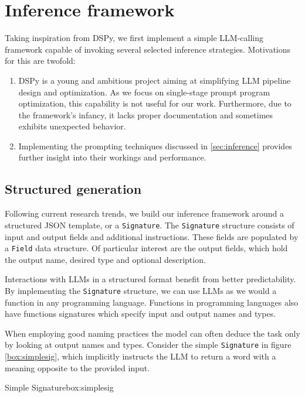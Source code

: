 \section{Inference framework}
Taking inspiration from DSPy\cite{khattab2023dspycompilingdeclarativelanguage}, we first implement a simple LLM-calling framework 
capable of invoking several selected inference strategies. Motivations for this are twofold:
\begin{enumerate}
    \item DSPy is a young and ambitious project aiming at simplifying LLM pipeline design and optimization. 
    As we focus on single-stage prompt program optimization, this capability is not useful for our work. 
    Furthermore, due to the framework's infancy, it lacks proper documentation and sometimes exhibits unexpected behavior.
    \item Implementing the prompting techniques discussed in \ref{sec:inference} provides further insight into their workings and performance.
\end{enumerate}

\subsection{Structured generation}
Following current research trends\cite{zhang2025metapromptingaisystems}, we build our inference framework around a structured JSON template,
or a \texttt{Signature}. The \texttt{Signature} structure consists of input and output fields and additional instructions. 
These fields are populated by a \texttt{Field} data structure.
Of particular interest are the output fields, which hold the output name, desired type and optional description. 

Interactions with LLMs in a structured format benefit from better predictability. By implementing the \texttt{Signature} structure,
we can use LLMs as we would a function in any programming language. Functions in programming languages also have functions signatures which
specify input and output names and types.

When employing good naming practices the model can often deduce the task only by looking at output names and types.
Consider the simple \texttt{Signature} in figure \ref{box:simplesig}, which implicitly instructs the LLM to return a word with a meaning opposite to the provided input.

\begin{figurebox}{Simple Signature}{box:simplesig}
\end{figurebox}

